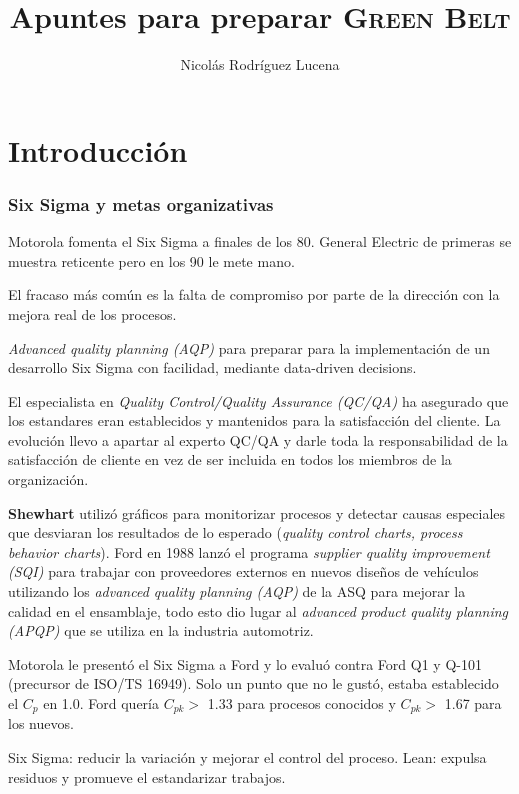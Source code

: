 \documentclass[]{article}
\title{Apuntes para preparar \textsc{Green Belt}}
\author{Nicolás Rodríguez Lucena}
\begin{document}
\maketitle

\part*{Introducción}
\section{Six Sigma y metas organizativas}
Motorola fomenta el Six Sigma a finales de los 80. General Electric de primeras se muestra reticente pero en los 90 le mete mano. 

El fracaso más común es la falta de compromiso por parte de la dirección con la mejora real de los procesos.

\textit{Advanced quality planning (AQP)} para preparar para la implementación de un desarrollo Six Sigma con facilidad, mediante data-driven decisions. 

El especialista en \textit{Quality Control/Quality Assurance (QC/QA)} ha asegurado que los estandares eran establecidos y mantenidos para la satisfacción del cliente. La evolución llevo a apartar al experto QC/QA y darle toda la responsabilidad de la satisfacción de cliente en vez de ser incluida en todos los miembros de la organización. 

\textbf{Shewhart} utilizó gráficos para monitorizar procesos y detectar causas especiales que desviaran los resultados de lo esperado (\textit{quality control charts, process behavior charts}). \newline
Ford en 1988 lanzó el programa \textit{supplier quality improvement (SQI)} para trabajar con proveedores externos en nuevos diseños de vehículos utilizando los \textit{advanced quality planning (AQP)} de la ASQ para mejorar la calidad en el ensamblaje, todo esto dio lugar al \textit{advanced product quality planning (APQP)} que se utiliza en la industria automotriz. 

Motorola le presentó el Six Sigma a Ford y lo evaluó contra Ford Q1 y Q-101 (precursor de ISO/TS 16949). Solo un punto que no le gustó, estaba establecido el $C_p$ en 1.0. Ford quería $C_{pk} >$ 1.33 para procesos conocidos y $C_{pk} >$ 1.67 para los nuevos.

Six Sigma: reducir la variación y mejorar el control del proceso. Lean: expulsa residuos y promueve el estandarizar trabajos. 
\end{document}
